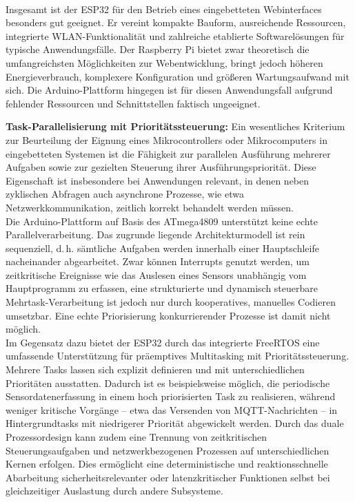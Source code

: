 \\
Insgesamt ist der ESP32 für den Betrieb eines eingebetteten Webinterfaces besonders gut geeignet. Er vereint kompakte Bauform, ausreichende Ressourcen, integrierte WLAN-Funktionalität und zahlreiche etablierte Softwarelösungen für typische Anwendungsfälle. Der Raspberry Pi bietet zwar theoretisch die umfangreichsten Möglichkeiten zur Webentwicklung, bringt jedoch höheren Energieverbrauch, komplexere Konfiguration und größeren Wartungsaufwand mit sich. Die Arduino-Plattform hingegen ist für diesen Anwendungsfall aufgrund fehlender Ressourcen und Schnittstellen faktisch ungeeignet.



\vspace{5mm}

\noindent\textbf{Task-Parallelisierung mit Prioritätssteuerung:} Ein wesentliches Kriterium zur Beurteilung der Eignung eines Mikrocontrollers oder Mikrocomputers in eingebetteten Systemen ist die Fähigkeit zur parallelen Ausführung mehrerer Aufgaben sowie zur gezielten Steuerung ihrer Ausführungspriorität. Diese Eigenschaft ist insbesondere bei Anwendungen relevant, in denen neben zyklischen Abfragen auch asynchrone Prozesse, wie etwa Netzwerkkommunikation, zeitlich korrekt behandelt werden müssen.
\\
Die Arduino-Plattform auf Basis des ATmega4809 unterstützt keine echte Parallelverarbeitung. Das zugrunde liegende Architekturmodell ist rein sequenziell, d.\,h. sämtliche Aufgaben werden innerhalb einer Hauptschleife nacheinander abgearbeitet. Zwar können Interrupts genutzt werden, um zeitkritische Ereignisse wie das Auslesen eines Sensors unabhängig vom Hauptprogramm zu erfassen, eine strukturierte und dynamisch steuerbare Mehrtask-Verarbeitung ist jedoch nur durch kooperatives, manuelles Codieren umsetzbar. Eine echte Priorisierung konkurrierender Prozesse ist damit nicht möglich.
\\
Im Gegensatz dazu bietet der ESP32 durch das integrierte FreeRTOS eine umfassende Unterstützung für präemptives Multitasking mit Prioritätssteuerung. Mehrere Tasks lassen sich explizit definieren und mit unterschiedlichen Prioritäten ausstatten. Dadurch ist es beispielsweise möglich, die periodische Sensordatenerfassung in einem hoch priorisierten Task zu realisieren, während weniger kritische Vorgänge – etwa das Versenden von MQTT-Nachrichten – in Hintergrundtasks mit niedrigerer Priorität abgewickelt werden. Durch das duale Prozessordesign kann zudem eine Trennung von zeitkritischen Steuerungsaufgaben und netzwerkbezogenen Prozessen auf unterschiedlichen Kernen erfolgen. Dies ermöglicht eine deterministische und reaktionsschnelle Abarbeitung sicherheitsrelevanter oder latenzkritischer Funktionen selbst bei gleichzeitiger Auslastung durch andere Subsysteme.
